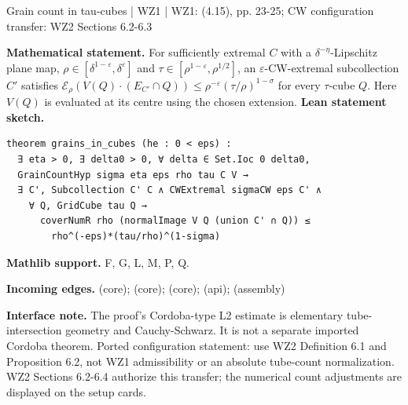\documentclass[10pt,a4paper]{article}
\newcommand{\nodecard}[1]{\hyperlink{node-#1}{\texttt{\detokenize{#1}}}}
\begin{document}
\begin{minipage}{\linewidth}
\hypertarget{node-L4_9}{}
\begin{tcolorbox}[colback=white,colframe=grainsfg,colbacktitle=grainsbg,coltitle=ink,boxrule=0.45pt,arc=1.6mm,left=3mm,right=3mm,top=2mm,bottom=2mm,title={\sffamily\bfseries WZ1 Lemma 4.9 / CW \hfill \texttt{L4\_9}}]
{\sffamily\small\color{muted}Grain count in tau-cubes | WZ1 | WZ1: (4.15), pp. 23-25; CW configuration transfer: WZ2 Sections 6.2-6.3}\par
\textbf{Mathematical statement.} For sufficiently extremal $C$ with a $\delta^{-\eta}$-Lipschitz plane map, $\rho\in[\delta^{1-\varepsilon},\delta^\varepsilon]$ and $\tau\in[\rho^{1-\varepsilon},\rho^{1/2}]$, an $\varepsilon$-CW-extremal subcollection $C'$ satisfies
$\mathcal E_\rho(V(Q)\cdot(E_{C'}\cap Q))\le\rho^{-\varepsilon}(\tau/\rho)^{1-\sigma}$
for every $\tau$-cube $Q$. Here $V(Q)$ is evaluated at its centre using the chosen extension.
\smallskip\textbf{Lean statement sketch.}
\begin{Verbatim}[fontsize=\small,breaklines=true,breakanywhere=true,tabsize=2]
theorem grains_in_cubes (he : 0 < eps) :
  ∃ eta > 0, ∃ delta0 > 0, ∀ delta ∈ Set.Ioc 0 delta0,
  GrainCountHyp sigma eta eps rho tau C V →
  ∃ C', Subcollection C' C ∧ CWExtremal sigmaCW eps C' ∧
    ∀ Q, GridCube tau Q →
      coverNumR rho (normalImage V Q (union C' ∩ Q)) ≤
        rho^(-eps)*(tau/rho)^(1-sigma)
\end{Verbatim}
{\footnotesize\textbf{Mathlib support.} F, G, L, M, P, Q.\par
\textbf{Incoming edges.} \nodecard{W2P6_2} (core); \nodecard{L3_4} (core); \nodecard{DAD} (core); \nodecard{Imass} (api); \nodecard{L4_8} (assembly)\par}
{\footnotesize\textbf{Interface note.} The proof's Cordoba-type L2 estimate is elementary tube-intersection geometry and Cauchy-Schwarz. It is not a separate imported Cordoba theorem. Ported configuration statement: use WZ2 Definition 6.1 and Proposition 6.2, not WZ1 admissibility or an absolute tube-count normalization. WZ2 Sections 6.2-6.4 authorize this transfer; the numerical count adjustments are displayed on the setup cards.}
\end{tcolorbox}\end{minipage}\par\medskip
\end{document}
